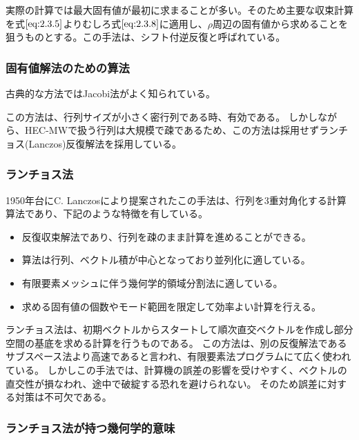 \documentclass[a4paper,pandoc,ja=standard]{bxjsarticle}
\providecommand{\tightlist}{%
  \setlength{\itemsep}{0pt}\setlength{\parskip}{0pt}}
\begin{document}
実際の計算では最大固有値が最初に求まることが多い。そのため主要な収束計算を式\(\eqref{eq:2.3.5}\)よりむしろ式\(\eqref{eq:2.3.8}\)に適用し、\(\rho\)周辺の固有値から求めることを狙うものとする。この手法は、シフト付逆反復と呼ばれている。

\hypertarget{ux56faux6709ux5024ux89e3ux6cd5ux306eux305fux3081ux306eux7b97ux6cd5}{%
\subsubsection{固有値解法のための算法}\label{ux56faux6709ux5024ux89e3ux6cd5ux306eux305fux3081ux306eux7b97ux6cd5}}

古典的な方法ではJacobi法がよく知られている。

この方法は、行列サイズが小さく密行列である時、有効である。
しかしながら、HEC-MWで扱う行列は大規模で疎であるため、この方法は採用せずランチョス(Lanczos)反復解法を採用している。

\hypertarget{ux30e9ux30f3ux30c1ux30e7ux30b9ux6cd5}{%
\subsubsection{ランチョス法}\label{ux30e9ux30f3ux30c1ux30e7ux30b9ux6cd5}}

1950年台にC. Lanczosにより提案されたこの手法は、行列を3重対角化する計算算法であり、下記のような特徴を有している。

\begin{itemize}
\tightlist
\item
  反復収束解法であり、行列を疎のまま計算を進めることができる。
\item
  算法は行列、ベクトル積が中心となっており並列化に適している。
\item
  有限要素メッシュに伴う幾何学的領域分割法に適している。
\item
  求める固有値の個数やモード範囲を限定して効率よい計算を行える。
\end{itemize}

ランチョス法は、初期ベクトルからスタートして順次直交ベクトルを作成し部分空間の基底を求める計算を行うものである。
この方法は、別の反復解法であるサブスペース法より高速であると言われ、有限要素法プログラムにて広く使われている。
しかしこの手法では、計算機の誤差の影響を受けやすく、ベクトルの直交性が損なわれ、途中で破綻する恐れを避けられない。
そのため誤差に対する対策は不可欠である。

\hypertarget{ux30e9ux30f3ux30c1ux30e7ux30b9ux6cd5ux304cux6301ux3064ux5e7eux4f55ux5b66ux7684ux610fux5473}{%
\subsubsection{ランチョス法が持つ幾何学的意味}\label{ux30e9ux30f3ux30c1ux30e7ux30b9ux6cd5ux304cux6301ux3064ux5e7eux4f55ux5b66ux7684ux610fux5473}}
\end{document}
